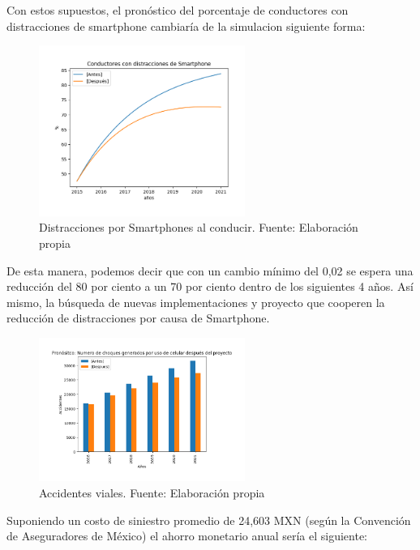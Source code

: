 \documentclass{article}
\begin{document}
Con estos supuestos, el pronóstico del porcentaje de conductores con distracciones de smartphone cambiaría de la simulaci{on }
siguiente forma:

	\begin{figure}[H]\centering
	\includegraphics[width=0.6\textwidth]{resources/img/distraction_compare_img.png}
	\caption{\label{fig:smart_accidents_compare} Distracciones por Smartphones al conducir. Fuente: Elaboración propia}
    \end{figure}

De esta manera, podemos decir que con un cambio mínimo del 0,02 se espera una reducción del 80 por ciento  a un 70 por ciento dentro de los siguientes 4 años. Así mismo, la búsqueda de nuevas implementaciones y proyecto que cooperen la reducción de distracciones por causa de Smartphone. 


	\begin{figure}[H]\centering
	\includegraphics[width=0.6\textwidth]{resources/img/smart_accidents_after.png}
	\caption{\label{fig:smart_accidents_after} Accidentes viales. Fuente: Elaboración propia}
    \end{figure}

Suponiendo un costo de siniestro promedio de 24,603 MXN (según la Convención de Aseguradores de México) el ahorro
monetario anual sería el siguiente:
\end{document}
